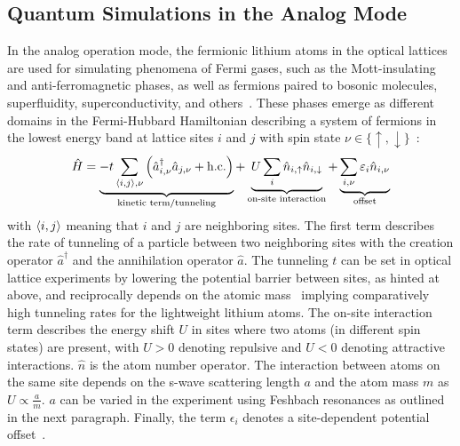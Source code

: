\subsection*{Quantum Simulations in the Analog Mode}\label{ch:analog_mode}
In the analog operation mode, the fermionic lithium atoms in the optical lattices are used for simulating phenomena of Fermi gases, such as the Mott-insulating and anti-ferromagnetic phases, as well as fermions paired to bosonic molecules, superfluidity,  superconductivity, and others~\cite{bloch_quantum_2012,esslinger_fermi-hubbard_2010}. These phases emerge as different domains in the Fermi-Hubbard Hamiltonian describing a system of fermions in the lowest energy band at lattice sites $i$ and $j$ with spin state $\nu \in \{{\uparrow}, {\downarrow}\}$~\cite{hubbard_electron_1963,esslinger_fermi-hubbard_2010}:
\begin{align}\label{eq:fermi_hubbard_hamiltonian}
    \hat H =
    \underbrace{-t \sum\limits_{\Braket{i,j}, \nu} \left(\hat a^\dagger_{i, \nu} \hat a_{j, \nu} + \text{h.c.}\right)}_\text{kinetic term/tunneling}
    + \underbrace{U \sum\limits_i \hat n_{i, {\uparrow}} \hat n_{i, {\downarrow}}}_\text{on-site interaction}
    + \underbrace{\sum\limits_{i, \nu} \epsilon_{i} \hat n_{i, \nu}}_\text{offset}
\end{align}
with $\Braket{i,j}$ meaning that $i$ and $j$ are neighboring sites. The first term describes the rate of tunneling of a particle between two neighboring sites with the creation operator $\hat a^\dagger$ and the annihilation operator $\hat a$. The tunneling $t$ can be set in optical lattice experiments by lowering the potential barrier between sites, as hinted at above, and reciprocally depends on the atomic mass~\cite{jaksch_cold_1998} implying comparatively high tunneling rates for the lightweight lithium atoms. The on-site interaction term describes the energy shift $U$ in sites where two atoms (in different spin states) are present, with $U > 0$ denoting repulsive and $U < 0$ denoting attractive interactions. $\hat n$ is the atom number operator. The interaction between atoms on the same site depends on the s-wave scattering length $a$ and the atom mass $m$ as $U \propto \frac{a}{m}$. $a$ can be varied in the experiment using Feshbach resonances as outlined in the next paragraph. Finally, the term $\epsilon_i$ denotes a site-dependent potential offset~\cite{esslinger_fermi-hubbard_2010}.

